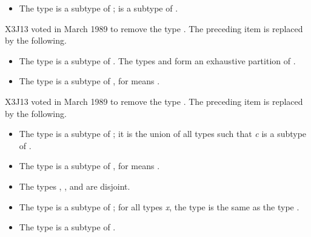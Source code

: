 \begin{obsolete}
\begin{itemize}
\item
The type  is a subtype of ;
 is a subtype of .
\end{itemize}
\end{obsolete}


\begin{newer}
X3J13 voted in March 1989  to remove the type .
The preceding item is replaced by the following.
\begin{itemize}
\item
The type  is a subtype of .
The types  and 
form an exhaustive partition of .
\end{itemize}
\end{newer}

\begin{obsolete}
\begin{itemize}
\item
The type  is a subtype of , for 
means .
\end{itemize}
\end{obsolete}

\newpage%
\begin{newer}
X3J13 voted in March 1989  to remove the type .
The preceding item is replaced by the following.
\begin{itemize}
\item
The type  is a subtype of ; it is the union of
all types  such that \emph{c} is a subtype of .
\end{itemize}
\end{newer}

\begin{itemize}
\item
The type  is a subtype of , for 
means .

\item
The types , , and  are disjoint.

\item
The type  is a subtype of ; for all types \emph{x},
the type  is the same as the type .

\item
The type  is a subtype of .
\end{itemize}

